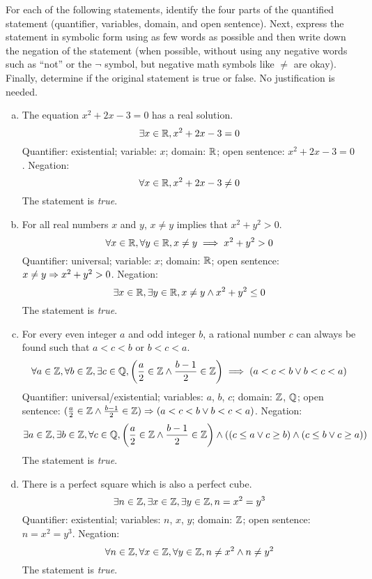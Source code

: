 \documentclass{agony}
\begin{document}
\question For each of the following statements, identify the four parts of the quantified statement
(quantifier, variables, domain, and open sentence).
Next, express the statement in symbolic form using as few words as possible and then write down the negation of the statement
(when possible, without using any negative words such as ``not'' or the $\lnot$ symbol, but negative math symbols like $\neq$ are okay).
Finally, determine if the original statement is true or false.
No justification is needed.
\begin{enumerate}[(a)]
  \item The equation $x^2+2x-3=0$ has a real solution.
        \[ \exists x\in\mathbb{R}, x^2+2x-3 = 0 \]
        Quantifier: existential;
        variable: $x$;
        domain: $\mathbb{R}$;
        open sentence: $x^2+2x-3=0$.
        Negation:
        \[ \forall x\in\mathbb{R}, x^2+2x-3 \neq 0 \]
        The statement is \emph{true}.
  \item For all real numbers $x$ and $y$, $x \neq y$ implies that $x^2+y^2 > 0$.
        \[ \forall x\in\mathbb{R}, \forall y\in\mathbb{R}, x \neq y \implies x^2+y^2>0 \]
        Quantifier: universal;
        variable: $x$;
        domain: $\mathbb{R}$;
        open sentence: $x \neq y \Rightarrow x^2+y^2>0$.
        Negation:
        \[ \exists x\in\mathbb{R}, \exists y\in\mathbb{R}, x \neq y \land x^2+y^2\leq0 \]
        The statement is \emph{true}.
  \item For every even integer $a$ and odd integer $b$, a rational number $c$ can always be found such that $a<c<b$ or $b<c<a$.
        \[
          \forall a\in\mathbb{Z}, \forall b\in\mathbb{Z}, \exists c\in\mathbb{Q},
          \left(\frac{a}{2}\in\mathbb{Z} \land \frac{b-1}{2}\in\mathbb{Z}\right) \implies (a<c<b \lor b<c<a)
        \]
        Quantifier: universal/existential;
        variables: $a$, $b$, $c$;
        domain: $\mathbb{Z}$, $\mathbb{Q}$;
        open sentence: $(\frac{a}{2}\in\mathbb{Z} \land \frac{b-1}{2}\in\mathbb{Z}) \Rightarrow (a<c<b \lor b<c<a)$.
        Negation:
        \[
          \exists a\in\mathbb{Z}, \exists b\in\mathbb{Z}, \forall c\in\mathbb{Q},
          \qty(\frac{a}{2}\in\mathbb{Z} \land \frac{b-1}{2}\in\mathbb{Z}) \land
          \qty((c \leq a \lor c \geq b) \land (c \leq b \lor c \geq a))
        \]
        The statement is \emph{true}.
  \item There is a perfect square which is also a perfect cube.
        \[ \exists n\in\mathbb{Z}, \exists x\in\mathbb{Z}, \exists y\in\mathbb{Z}, n=x^2=y^3 \]
        Quantifier: existential; variables: $n$, $x$, $y$; domain: $\mathbb{Z}$; open sentence: $n=x^2=y^3$.
        Negation:
        \[ \forall n\in\mathbb{Z}, \forall x\in\mathbb{Z}, \forall y\in\mathbb{Z}, n \neq x^2 \land n \neq y^2 \]
        The statement is \emph{true}.
\end{enumerate}
\end{document}
